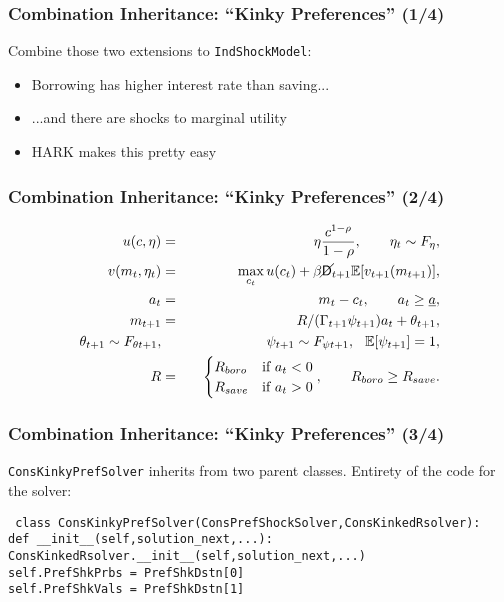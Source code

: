 \documentclass[public]{beamer}\beamerdefaultoverlayspecification{<+->}
\begin{document}
\begin{frame}
  \frametitle{Combination Inheritance: ``Kinky Preferences'' (1/4)}
  Combine those two extensions to \texttt{IndShockModel}:
  \begin{itemize}
  \item Borrowing has higher interest rate than saving...

  \item ...and there are shocks to marginal utility

  \item HARK makes this pretty easy
  \end{itemize}
\end{frame}

\begin{frame}
  \frametitle{Combination Inheritance: ``Kinky Preferences'' (2/4)}
  \begin{eqnarray*}
    u(c,\eta) &=& \eta \frac{c^{1-\rho}}{1-\rho}, \qquad \eta_t \sim F_{\eta},\\
    v(m_t,\eta_t) &=& \max_{c_t} u(c_t) + \beta \cancel{\mathsf{D}}_{t+1} \mathbb{E} [v_{t+1}(m_{t+1}) ], \\
    a_t &=& m_t - c_t, \qquad a_t \geq \underline{a}, \\
    m_{t+1} &=& R/(\Gamma_{t+1} \psi_{t+1}) a_t + \theta_{t+1}, \\
    \theta_{t+1} \sim F_{\theta t+1}, &\qquad& \psi_{t+1} \sim F_{\psi t+1}, \hspace{0.25cm} \mathbb{E}[\psi_{t+1}] = 1, \\
    R &=& \begin{cases}
      R_{boro} & \text{if  } a_t < 0 \\
      R_{save} & \text{if  } a_t > 0
    \end{cases}, \qquad R_{boro} \geq R_{save}.
  \end{eqnarray*}
\end{frame}

\begin{frame}
  \frametitle{Combination Inheritance: ``Kinky Preferences'' (3/4)}
  \texttt{ConsKinkyPrefSolver} inherits from two parent classes.  Entirety of the code for the solver:

  \scriptsize{
    \texttt{
      class ConsKinkyPrefSolver(ConsPrefShockSolver,ConsKinkedRsolver):\\
      \qquad def \_\_init\_\_(self,solution\_next,...):\\
      \qquad \qquad ConsKinkedRsolver.\_\_init\_\_(self,solution\_next,...)\\
      \qquad \qquad self.PrefShkPrbs = PrefShkDstn[0]\\
      \qquad \qquad self.PrefShkVals = PrefShkDstn[1]\\
    }}
\end{frame}
\end{document}
